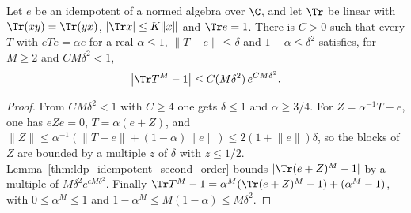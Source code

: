\begin{lemma}
    \label{thm:ldp_idempotent_compressed_second_order}
    \leanok
    Let $e$ be an idempotent of a normed algebra over $\C$, and let $\Tr$ be linear with
    $\Tr(xy)=\Tr(yx)$, $\lvert\Tr x\rvert\le K\lVert x\rVert$ and $\Tr e=1$. There is $C>0$
    such that every $T$ with $eTe=\alpha e$ for a real $\alpha\le1$,
    $\lVert T-e\rVert\le\delta$ and $1-\alpha\le\delta^2$ satisfies, for $M\ge2$ and
    $CM\delta^2<1$,
    \begin{align*}
        \bigl\lvert\Tr T^M-1\bigr\rvert\le C(M\delta^2)\,e^{CM\delta^2}.
    \end{align*}
\end{lemma}
\begin{proof}
    \leanok
    From $CM\delta^2<1$ with $C\ge4$ one gets $\delta\le1$ and $\alpha\ge3/4$. For
    $Z=\alpha^{-1}T-e$, one has $eZe=0$, $T=\alpha(e+Z)$, and
    $\lVert Z\rVert\le\alpha^{-1}(\lVert T-e\rVert+(1-\alpha)\lVert e\rVert)
        \le2(1+\lVert e\rVert)\delta$, so the blocks of $Z$ are bounded by a multiple $z$ of
    $\delta$ with $z\le1/2$. Lemma~\ref{thm:ldp_idempotent_second_order} bounds
    $\lvert\Tr(e+Z)^M-1\rvert$ by a multiple of $M\delta^2e^{cM\delta^2}$. Finally
    $\Tr T^M-1=\alpha^M(\Tr(e+Z)^M-1)+(\alpha^M-1)$, with $0\le\alpha^M\le1$ and
    $1-\alpha^M\le M(1-\alpha)\le M\delta^2$.
\end{proof}

